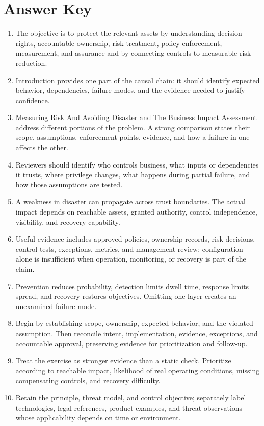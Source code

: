 \documentclass[11pt,letterpaper]{article}
\begin{document}
\section*{Answer Key}
\begin{enumerate}
\item The objective is to protect the relevant assets by understanding decision rights, accountable ownership, risk treatment, policy enforcement, measurement, and assurance and by connecting controls to measurable risk reduction.
\item Introduction provides one part of the causal chain: it should identify expected behavior, dependencies, failure modes, and the evidence needed to justify confidence.
\item Measuring Risk And Avoiding Disaster and The Business Impact Assessment address different portions of the problem. A strong comparison states their scope, assumptions, enforcement points, evidence, and how a failure in one affects the other.
\item Reviewers should identify who controls business, what inputs or dependencies it trusts, where privilege changes, what happens during partial failure, and how those assumptions are tested.
\item A weakness in disaster can propagate across trust boundaries. The actual impact depends on reachable assets, granted authority, control independence, visibility, and recovery capability.
\item Useful evidence includes approved policies, ownership records, risk decisions, control tests, exceptions, metrics, and management review; configuration alone is insufficient when operation, monitoring, or recovery is part of the claim.
\item Prevention reduces probability, detection limits dwell time, response limits spread, and recovery restores objectives. Omitting one layer creates an unexamined failure mode.
\item Begin by establishing scope, ownership, expected behavior, and the violated assumption. Then reconcile intent, implementation, evidence, exceptions, and accountable approval, preserving evidence for prioritization and follow-up.
\item Treat the exercise as stronger evidence than a static check. Prioritize according to reachable impact, likelihood of real operating conditions, missing compensating controls, and recovery difficulty.
\item Retain the principle, threat model, and control objective; separately label technologies, legal references, product examples, and threat observations whose applicability depends on time or environment.
\end{enumerate}
\end{document}
